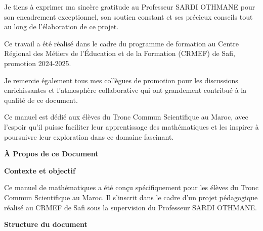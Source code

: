 \documentclass[11pt,%
	fleqn,%
	a4paper,%
	twoside%
]{backagBook}
\begin{document}
\vspace{0.5cm}

Je tiens à exprimer ma sincère gratitude au Professeur SARDI OTHMANE pour son encadrement exceptionnel, son soutien constant et ses précieux conseils tout au long de l'élaboration de ce projet.

\vspace{0.5cm}

Ce travail a été réalisé dans le cadre du programme de formation au Centre Régional des Métiers de l'Éducation et de la Formation (CRMEF) de Safi, promotion 2024-2025.

\vspace{0.5cm}

Je remercie également tous mes collègues de promotion pour les discussions enrichissantes et l'atmosphère collaborative qui ont grandement contribué à la qualité de ce document.

\vspace{0.5cm}

Ce manuel est dédié aux élèves du Tronc Commun Scientifique au Maroc, avec l'espoir qu'il puisse faciliter leur apprentissage des mathématiques et les inspirer à poursuivre leur exploration dans ce domaine fascinant.


\clearpage %
\thispagestyle{empty}

\begin{center}
    \vspace*{2cm}
    {\LARGE\bfseries\sffamily\color{primary}À Propos de ce Document}\par
    \vspace{1.5cm}
\end{center}

\textbf{Contexte et objectif}

\vspace{0.3cm}
Ce manuel de mathématiques a été conçu spécifiquement pour les élèves du Tronc Commun Scientifique au Maroc. Il s'inscrit dans le cadre d'un projet pédagogique réalisé au CRMEF de Safi sous la supervision du Professeur SARDI OTHMANE.

\vspace{0.5cm}

\textbf{Structure du document}
\end{document}

